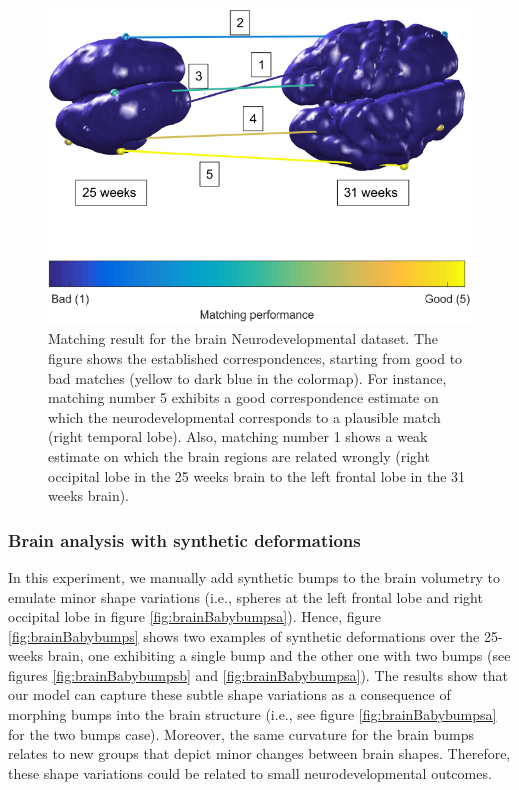 \documentclass[]{article}
\begin{document}
\begin{figure}[ht!]
	\centering
	
	\includegraphics[width=0.8\linewidth]{img/brainBabyMatch2v}
	\caption{Matching result for the brain Neurodevelopmental dataset.  The figure shows the established correspondences, starting from good to bad matches (yellow to dark blue in the colormap). For instance, matching number 5 exhibits a good correspondence estimate on which the neurodevelopmental corresponds to a plausible match  (right temporal lobe). Also, matching number 1 shows a weak estimate on which the brain regions are related wrongly (right occipital lobe in the 25 weeks brain to the left frontal lobe in the 31 weeks brain). }
	\label{fig:brainBabyM}
\end{figure}

\subsubsection{Brain analysis with synthetic deformations}

In this experiment, we manually add synthetic bumps to the brain volumetry to emulate minor shape variations (i.e., spheres at the left frontal lobe and right occipital lobe in figure \ref{fig:brainBabybumpsa}). Hence, figure \ref{fig:brainBabybumps} shows two examples of synthetic deformations over the 25-weeks brain, one exhibiting a single bump and the other one with two bumps (see figures \ref{fig:brainBabybumpsb} and \ref{fig:brainBabybumpsa}). The results show that our model can capture these subtle shape variations as a consequence of morphing bumps into the brain structure (i.e., see figure \ref{fig:brainBabybumpsa} for the two bumps case). Moreover, the same curvature for the brain bumps relates to new groups that depict minor changes between brain shapes. Therefore, these shape variations could be related to small neurodevelopmental outcomes.
\end{document}
